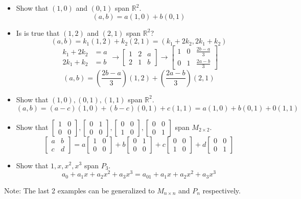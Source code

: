 \documentclass[12pt]{article}
\begin{document}
\begin{example} \begin{itemize} \item Show that $(1, 0)$ and $(0, 1)$ span $\mathbb{R}^2$. $$ (a, b) = a(1, 0) + b(0, 1) $$ \item Is is true that $(1, 2)$ and $(2, 1)$ span $\mathbb{R}^2$? $$ (a, b) = k_1(1, 2) + k_2(2, 1) = (k_1 + 2k_2, 2k_1 + k_2) $$ $$ \begin{aligned} k_1 + 2k_2 &= a \\ 2k_1 + k_2 &= b \end{aligned} \rightarrow \begin{bmatrix} 1 & 2 & a \\ 2 & 1 & b \end{bmatrix} \rightarrow \begin{bmatrix} 1 & 0 & \frac{2b - a}{3} \\ 0 & 1 & \frac{2a - b}{3} \end{bmatrix} $$ $$ (a, b) = (\frac{2b - a}{3})(1, 2) + (\frac{2a - b}{3})(2, 1) $$ 
\item Show that $(1, 0), (0, 1), (1, 1)$ span $\mathbb{R}^2$. $$ (a, b) = (a - c)(1, 0) + (b - c)(0, 1) + c(1, 1) = a(1, 0) + b(0, 1) + 0(1, 1) $$ 
\item Show that $\begin{bmatrix} 1 & 0 \\ 0 & 0 \end{bmatrix}, \begin{bmatrix} 0 & 1 \\ 0 & 0 \end{bmatrix}, \begin{bmatrix} 0 & 0 \\ 1 & 0 \end{bmatrix}, \begin{bmatrix} 0 & 0 \\ 0 & 1 \end{bmatrix} $ span $M_{2 \times 2}$. $$ \begin{bmatrix} a & b \\ c & d \end{bmatrix} = a\begin{bmatrix} 1 & 0 \\ 0 & 0 \end{bmatrix} + b\begin{bmatrix} 0 & 1 \\ 0 & 0 \end{bmatrix} + c\begin{bmatrix} 0 & 0 \\ 1 & 0 \end{bmatrix} + d\begin{bmatrix} 0 & 0 \\ 0 & 1 \end{bmatrix} $$ 
\item Show that $1, x, x^2, x^3$ span $P_3$. $$ a_0 + a_1x + a_2x^2 + a_3x^3 = a_01 + a_1x + a_2x^2 + a_3x^3 $$ \end{itemize} Note: The last 2 examples can be generalized to $M_{n \times n}$ and $P_n$ respectively. \end{example}
\end{document}
